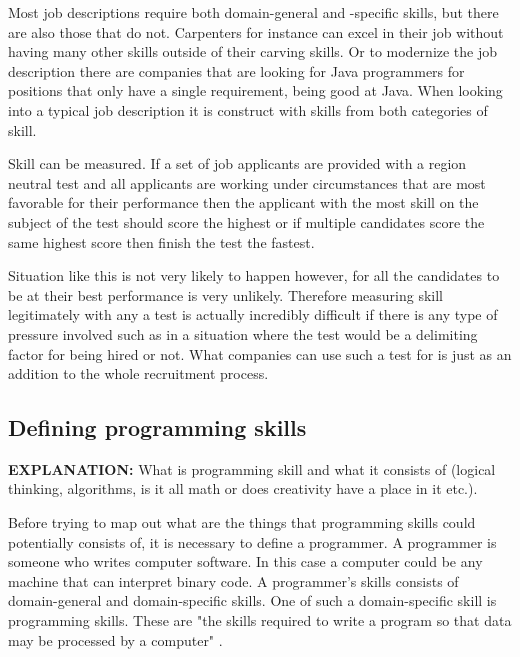 \documentclass[11pt,a4paper,oneside,article]{memoir}
\begin{document}
Most job descriptions require both domain-general and -specific skills, but there are also those that do not. Carpenters for instance can excel in their job without having many other skills outside of their carving skills. Or to modernize the job description there are companies that are looking for Java programmers for positions that only have a single requirement, being good at Java. When looking into a typical job description it is construct with skills from both categories of skill.

Skill can be measured. If a set of job applicants are provided with a region neutral test and all applicants are working under circumstances that are most favorable for their performance then the applicant with the most skill on the subject of the test should score the highest or if multiple candidates score the same highest score then finish the test the fastest. 

Situation like this is not very likely to happen however, for all the candidates to be at their best performance is very unlikely. Therefore measuring skill legitimately with any a test is actually incredibly difficult if there is any type of pressure involved such as in a situation where the test would be a delimiting factor for being hired or not. What companies can use such a test for is just as an addition to the whole recruitment process.

\subsection{Defining programming skills}
\textbf{EXPLANATION:} What is programming skill and what it consists of (logical thinking, algorithms, is it all math or does creativity have a place in it etc.).

Before trying to map out what are the things that programming skills could potentially consists of, it is necessary to define a programmer. A programmer is someone who writes computer software. In this case a computer could be any machine that can interpret binary code. A programmer's skills consists of domain-general and domain-specific skills. One of such a domain-specific skill is programming skills. These are "the skills required to write a program so that data may be processed by a computer" \cite{collins:skills}.  
\end{document}
